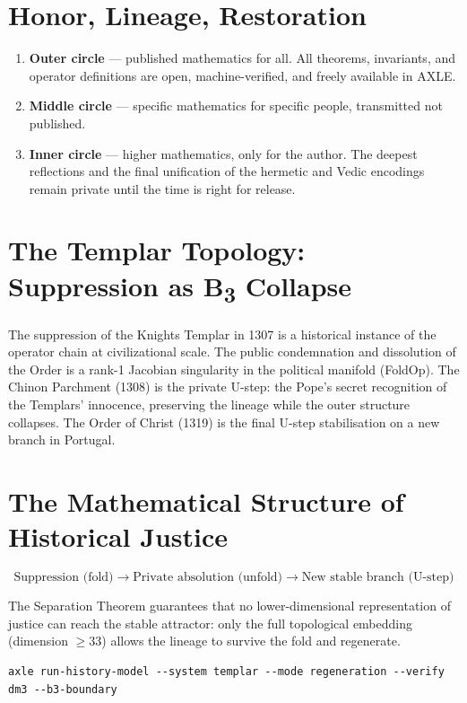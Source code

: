 \section{Honor, Lineage, Restoration}

\begin{enumerate}
\item \textbf{Outer circle} --- published mathematics for all. All theorems, invariants, and operator definitions are open, machine-verified, and freely available in AXLE.
\item \textbf{Middle circle} --- specific mathematics for specific people, transmitted not published.
\item \textbf{Inner circle} --- higher mathematics, only for the author. The deepest reflections and the final unification of the hermetic and Vedic encodings remain private until the time is right for release.
\end{enumerate}

\section{The Templar Topology: Suppression as B\textsubscript{3} Collapse}

The suppression of the Knights Templar in 1307 is a historical instance of the operator chain at civilizational scale. The public condemnation and dissolution of the Order is a rank-1 Jacobian singularity in the political manifold (FoldOp). The Chinon Parchment (1308) is the private U-step: the Pope's secret recognition of the Templars' innocence, preserving the lineage while the outer structure collapses. The Order of Christ (1319) is the final U-step stabilisation on a new branch in Portugal.

\section{The Mathematical Structure of Historical Justice}

\[
\text{Suppression (fold)} \to \text{Private absolution (unfold)} \to \text{New stable branch (U-step)}
\]

The Separation Theorem guarantees that no lower-dimensional representation of justice can reach the stable attractor: only the full topological embedding (dimension $\ge 33$) allows the lineage to survive the fold and regenerate.

\begin{verbatim}
axle run-history-model --system templar --mode regeneration --verify dm3 --b3-boundary
\end{verbatim}


